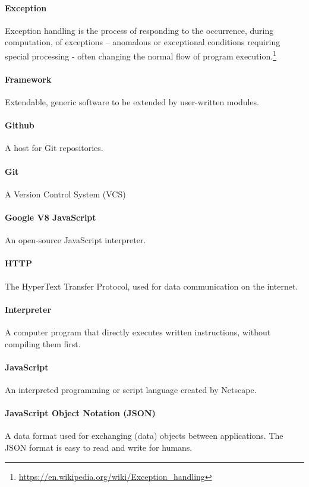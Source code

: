 \paragraph{Exception}
Exception handling is the process of responding to the occurrence, during computation, of exceptions – anomalous or exceptional conditions requiring special processing - often changing the normal flow of program execution.\footnote{\url{https://en.wikipedia.org/wiki/Exception_handling}}

\paragraph{Framework}
Extendable, generic software to be extended by user-written modules.

\paragraph{Github}
A host for Git repositories.

\paragraph{Git}
A Version Control System (VCS)

\paragraph{Google V8 JavaScript}
An open-source JavaScript interpreter.

\paragraph{HTTP}
The HyperText Transfer Protocol, used for data communication on the internet.

\paragraph{Interpreter}
A computer program that directly executes written instructions, without compiling them first.

\paragraph{JavaScript}
An interpreted programming or script language created by Netscape.

\paragraph{JavaScript Object Notation (JSON)}
A data format used for exchanging (data) objects between applications. The JSON format is easy to read and write for humans.

